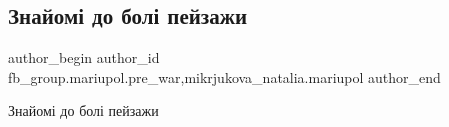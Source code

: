  
 
 
 
 

\subsection{Знайомі до болі пейзажи}
\label{sec:04_02_2023.fb.fb_group.mariupol.pre_war.6.znaiom__do_bol__peiz}
 
\ifcmt
 author_begin
   author_id fb_group.mariupol.pre_war,mikrjukova_natalia.mariupol
 author_end
\fi

Знайомі до болі пейзажи

